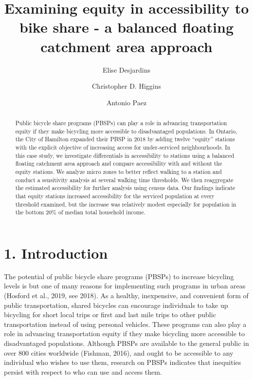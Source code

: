 \documentclass[]{elsarticle} %
\begin{document}
\begin{frontmatter}

  \title{Examining equity in accessibility to bike share - a balanced
floating catchment area approach}
    \author[McMaster University]{Elise Desjardins}
    \author[University of Toronto Scarborough]{Christopher D. Higgins}
    \author[McMaster University]{Antonio Paez}
      \address[McMaster University]{School of Earth, Environment \&
Society, McMaster University, 1280 Main Street West, Hamilton, ON
L8S4L8}
    \address[University of Toronto Scarborough]{Department of Geography
\& Planning, University of Toronto Scarborough, 1265 Military Trail,
Toronto, ON M1C1A4}
  
  \begin{abstract}
  Public bicycle share programs (PBSPs) can play a role in advancing
  transportation equity if they make bicycling more accessible to
  disadvantaged populations. In Ontario, the City of Hamilton expanded
  their PBSP in 2018 by adding twelve ``equity'' stations with the
  explicit objective of increasing access for under-serviced
  neighbourhoods. In this case study, we investigate differentials in
  accessibility to stations using a balanced floating catchment area
  approach and compare accessibility with and without the equity
  stations. We analyze micro zones to better reflect walking to a
  station and conduct a sensitivity analysis at several walking time
  thresholds. We then reaggregate the estimated accessibility for
  further analysis using census data. Our findings indicate that equity
  stations increased accessibility for the serviced population at every
  threshold examined, but the increase was relatively modest especially
  for population in the bottom 20\% of median total household income.
  \end{abstract}
  
 \end{frontmatter}

\newpage

\hypertarget{introduction}{%
\section{1. Introduction}\label{introduction}}

The potential of public bicycle share programs (PBSPs) to increase
bicycling levels is but one of many reasons for implementing such
programs in urban areas (Hosford et al., 2019, see 2018). As a healthy,
inexpensive, and convenient form of public transportation, shared
bicycles can encourage individuals to take up bicycling for short local
trips or first and last mile trips to other public transportation
instead of using personal vehicles. These programs can also play a role
in advancing transportation equity if they make bicycling more
accessible to disadvantaged populations. Although PBSPs are available to
the general public in over 800 cities worldwide (Fishman, 2016), and
ought to be accessible to any individual who wishes to use them,
research on PBSPs indicates that inequities persist with respect to who
can use and access them.
\end{document}

